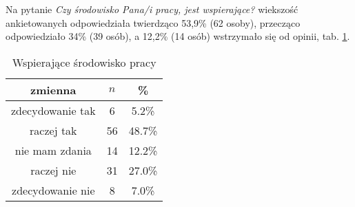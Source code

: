 Na pytanie \textit{Czy  środowisko  Pana/i pracy, jest wspierające?} wiekszość ankietowanych odpowiedziała twierdząco 53,9\% (62 osoby), przecząco odpowiedziało 34\% (39 osób), a 12,2\% (14 osób) wstrzymało się od opinii, tab. \ref{tab:Q7}.

\begin{table}[H]
\caption{Wspierające środowisko pracy}
\centering
\begin{tabular}{ | c | c | c |}
\hline
zmienna & $n$ & \% \\
\hline
zdecydowanie tak  &  6  & 5.2\% \\
\hline
raczej tak  &  56  & 48.7\% \\
\hline
nie mam zdania  &  14  & 12.2\% \\
\hline
raczej nie  &  31  & 27.0\% \\
\hline
zdecydowanie nie  &  8  & 7.0\% \\
\hline
\end{tabular}
\label{tab:Q7}
\end{table}
